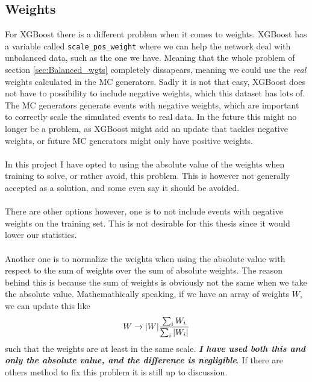 \documentclass[14pt, a4paper]{book}
\begin{document}
\subsection{Weights}
For XGBoost there is a different problem when it comes to weights. XGBoost has a variable called \verb|scale_pos_weight| where we can help the network deal with unbalanced data, such as the one we have. 
Meaning that the whole problem of section \ref{sec:Balanced_wgts} completely dissapears, meaning we could use the \textit{real} weights calculated in the MC generators.
Sadly it is not that easy, XGBoost does not have to possibility to include negative weights, which this dataset has lots of. The MC generators  generate events with negative weights, which are important to correctly scale the simulated events to real data.
In the future this might no longer be a problem, as XGBoost might add an update that tackles negative weights, or  future MC generators might only have positive weights.\\
\\In this project I have opted to using the absolute value of the weights when training to solve, or rather avoid, this problem. 
This is however not generally accepted as a solution, and some even say it should be avoided. \\
\\There are other options however, one is to not include events with negative weights on the training set. This is not desirable for this thesis since it would lower our statistics.\\
\\Another one  is to normalize the weights when using the absolute value with respect to the sum of weights over the sum of absolute weights. The reason behind this is because the sum of weights is obviously not the same when we take the absolute value. 
Mathemathically speaking, if we have an array of weights $W$, we can update this like
$$
W \rightarrow \abs{W}\frac{\sum_i W_i}{\sum_i\abs{W_i}}
$$
such that the weights are at least in the same scale. \textit{\textbf{I have used both this and only the absolute value, and the difference is negligible}}. 
If there are others method to fix this problem it is still up to discussion.



   
\end{document}
